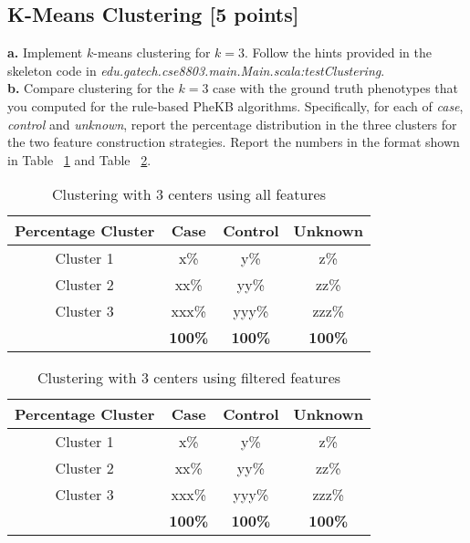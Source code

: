\documentclass[12pt]{article}
\begin{document}
\subsection{K-Means Clustering [5 points] } 
\textbf{a.} Implement $k$-means clustering for $k=3$. Follow the hints provided in the skeleton code in \textit{edu.gatech.cse8803.main.Main.scala:testClustering}.\\
\textbf{b.} Compare clustering for the $k=3$ case with the ground truth phenotypes that you computed for the rule-based PheKB algorithms. Specifically, for each of \textit{case}, \textit{control} and \textit{unknown}, report the percentage distribution in the three clusters for the two feature construction strategies. Report the numbers in the format shown in Table ~\ref{tbl:kmeansall} and Table ~\ref{tbl:kmeansfil}. \\

\begin{table}[h]
\centering
\begin{tabular}{ c | c | c | c }
  \hline
  Percentage Cluster & Case & Control & Unknown\\
  \hline                       
  Cluster 1 & x\% & y\% & z\% \\
  Cluster 2 & xx\% & yy\% & zz\% \\
  Cluster 3 & xxx\% & yyy\% & zzz\% \\
  \hline  
   & \bf{100\%} & \bf{100\%} & \bf{100\%} \\
  \hline  
\end{tabular}
\caption{Clustering with 3 centers using all features}
\label{tbl:kmeansall}
\end{table}

\begin{table}[h]
\centering
\begin{tabular}{ c | c | c | c }
  \hline
  Percentage Cluster & Case & Control & Unknown\\
  \hline                       
  Cluster 1 & x\% & y\% & z\% \\
  Cluster 2 & xx\% & yy\% & zz\% \\
  Cluster 3 & xxx\% & yyy\% & zzz\% \\
  \hline  
   & \bf{100\%} & \bf{100\%} & \bf{100\%} \\
  \hline  
\end{tabular}
\caption{Clustering with 3 centers using filtered features}
\label{tbl:kmeansfil}
\end{table}
\end{document}
